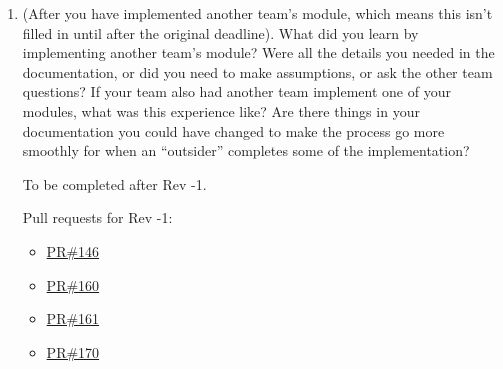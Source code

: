 \documentclass[12pt, titlepage]{article}
\begin{document}
\begin{enumerate}
We chose the design because it matches how we expect the project
to change: the AI model we use, the rules we check, and the way we store data are
all things we may need to replace or refine. Keeping those concerns separate
costs us more writing now, but it gives us clearer ownership and less fear of
breaking everything when one piece moves. Additionally, for a team of 4, these were tradeoffs that made sense for us.

  \item (After you have implemented another team's module, which means this
    isn't filled in until after the original deadline). What did you learn by
    implementing another team's module? Were all the details you needed in the
    documentation, or did you need to make assumptions, or ask the other team
    questions?  If your team also had another team implement one of your modules,
    what was this experience like?  Are there things in your documentation you
    could have changed to make the process go more smoothly for when an
    ``outsider'' completes some of the implementation?

To be completed after Rev -1.

Pull requests for Rev -1:
\begin{itemize}
  \item \href{https://github.com/shivyam/cas-course-optimization/pull/146}{PR\#146}
  \item \href{https://github.com/shivyam/cas-course-optimization/pull/160}{PR\#160}
  \item \href{https://github.com/shivyam/cas-course-optimization/pull/161}{PR\#161}
  \item \href{https://github.com/shivyam/cas-course-optimization/pull/170}{PR\#170}
\end{itemize}

\end{enumerate}
\end{document}
